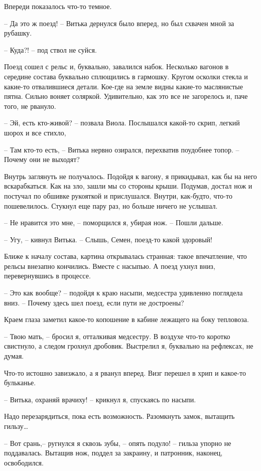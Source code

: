 \documentclass[a4paper]{book}
\begin{document}
Впереди показалось что-то темное. 

-- Да это ж поезд! -- Витька дернулся было вперед, но был схвачен мной за рубашку. 

-- Куда?! -- под ствол не суйся.

Поезд сошел с рельс и, буквально, завалился набок. Несколько вагонов в середине состава буквально сплющились в гармошку. Кругом осколки стекла и какие-то отвалившиеся детали. Кое-где на земле видны какие-то маслянистые пятна. Сильно воняет соляркой. Удивительно, как это все не загорелось и, паче того, не рвануло.

-- Эй, есть кто-живой? -- позвала Виола. Послышался какой-то скрип, легкий шорох и все стихло,

-- Там кто-то есть, -- Витька нервно озирался, перехватив поудобнее топор. -- Почему они не выходят?

Внутрь заглянуть не получалось. Подойдя к вагону, я прикидывал, как бы на него вскарабкаться. Как на зло, зашли мы со стороны крыши. Подумав, достал нож и постучал по обшивке рукояткой и прислушался. Внутри, как-будто, что-то пошевелилось. Стукнул еще пару раз, но больше ничего не услышал.

-- Не нравится это мне, -- поморщился я, убирая нож. -- Пошли дальше.

-- Угу, -- кивнул Витька. -- Слышь, Семен, поезд-то какой здоровый!

Ближе к началу состава, картина открывалась странная: такое впечатление, что рельсы внезапно кончились. Вместе с насыпью. А поезд ухнул вниз, перевернувшись в процессе. 

-- Это как вообще? -- подойдя к краю насыпи, медсестра удивленно поглядела вниз. -- Почему здесь шел поезд, если пути не достроены? 

Краем глаза заметил какое-то копошение в кабине лежащего на боку тепловоза. 

-- Твою мать, -- бросил я, отталкивая медсестру. В воздухе что-то коротко свистнуло, а следом грохнул дробовик. Выстрелил я, буквально на рефлексах, не думая. 

Что-то истошно завизжало, а я рванул вперед. Визг перешел в хрип и какое-то бульканье. 

-- Витька, охраняй врачиху! -- крикнул я, спускаясь по насыпи. 

Надо перезарядиться, пока есть возможность. Разомкнуть замок, вытащить гильзу\ldots 

-- Вот срань,-- ругнулся я сквозь зубы, -- опять подуло! -- гильза упорно не поддавалась. Вытащив нож, поддел за закраину, и патронник, наконец, освободился.
\end{document}
